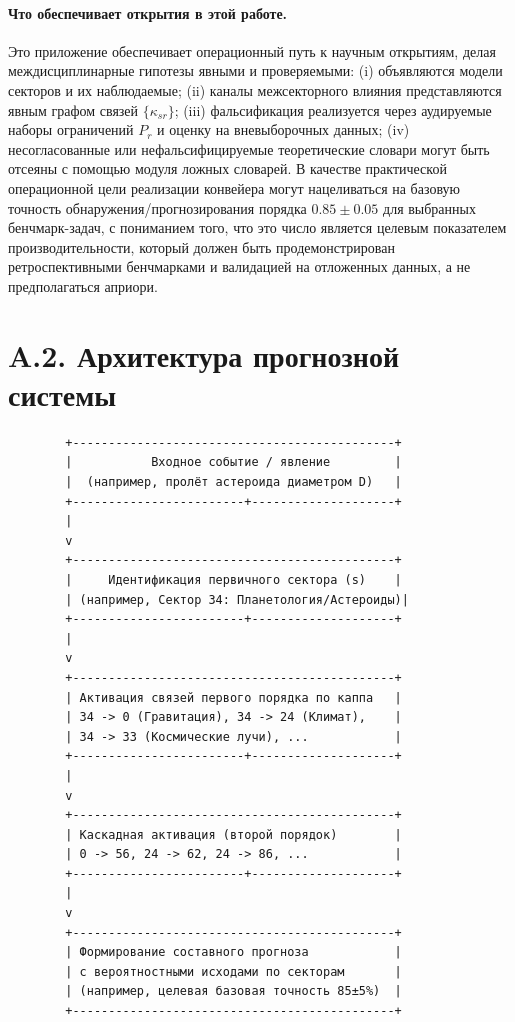 \documentclass[11pt,a4paper]{article}
\begin{document}
	\paragraph{Что обеспечивает открытия в этой работе.}
	Это приложение обеспечивает операционный путь к научным открытиям, делая междисциплинарные гипотезы явными и проверяемыми: (i) объявляются модели секторов и их наблюдаемые; (ii) каналы межсекторного влияния представляются явным графом связей $\{\kappa_{sr}\}$; (iii) фальсификация реализуется через аудируемые наборы ограничений $P_r$ и оценку на вневыборочных данных; (iv) несогласованные или нефальсифицируемые теоретические словари могут быть отсеяны с помощью модуля ложных словарей.
	В качестве практической операционной цели реализации конвейера могут нацеливаться на базовую точность обнаружения/прогнозирования порядка $0.85\pm0.05$ для выбранных бенчмарк-задач, с пониманием того, что это число является целевым показателем производительности, который должен быть продемонстрирован ретроспективными бенчмарками и валидацией на отложенных данных, а не предполагаться априори.
	
	\section*{A.2. Архитектура прогнозной системы}
	
	\begin{lstlisting}
		+---------------------------------------------+
		|           Входное событие / явление         |
		|  (например, пролёт астероида диаметром D)   |
		+------------------------+--------------------+
		|
		v
		+---------------------------------------------+
		|     Идентификация первичного сектора (s)    |
		| (например, Сектор 34: Планетология/Астероиды)|
		+------------------------+--------------------+
		|
		v
		+---------------------------------------------+
		| Активация связей первого порядка по каппа   |
		| 34 -> 0 (Гравитация), 34 -> 24 (Климат),    |
		| 34 -> 33 (Космические лучи), ...            |
		+------------------------+--------------------+
		|
		v
		+---------------------------------------------+
		| Каскадная активация (второй порядок)        |
		| 0 -> 56, 24 -> 62, 24 -> 86, ...            |
		+------------------------+--------------------+
		|
		v
		+---------------------------------------------+
		| Формирование составного прогноза            |
		| с вероятностными исходами по секторам       |
		| (например, целевая базовая точность 85±5%)  |
		+---------------------------------------------+
	\end{lstlisting}
	
\end{document}
